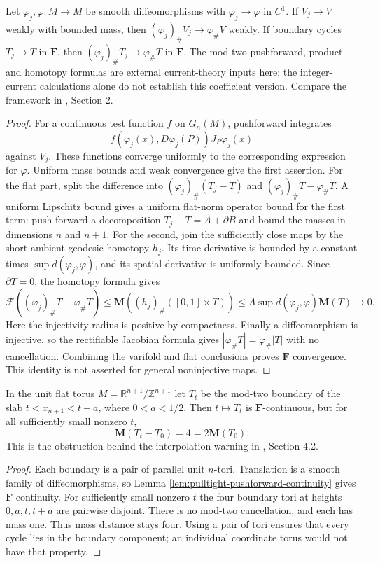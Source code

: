 \begin{lemma}\label{lem:pulltight-pushforward-continuity}
Let $\varphi_j,\varphi:M\to M$ be smooth diffeomorphisms with $\varphi_j\to\varphi$ in $C^1$. If $V_j\to V$ weakly with bounded mass, then $(\varphi_j)_\#V_j\to\varphi_\#V$ weakly. If boundary cycles $T_j\to T$ in $\mathbf F$, then $(\varphi_j)_\#T_j\to\varphi_\#T$ in $\mathbf F$. The mod-two pushforward, product and homotopy formulas are external current-theory inputs here; the integer-current calculations alone do not establish this coefficient version. Compare the framework in \cite{MNIndex}, Section 2.
\end{lemma}
\begin{proof}
For a continuous test function $f$ on $G_n(M)$, pushforward integrates
\[
 f(\varphi_j(x),D\varphi_j(P))J_P\varphi_j(x)
\]
against $V_j$. These functions converge uniformly to the corresponding expression for $\varphi$. Uniform mass bounds and weak convergence give the first assertion.
For the flat part, split the difference into $(\varphi_j)_\#(T_j-T)$ and $(\varphi_j)_\#T-\varphi_\#T$. A uniform Lipschitz bound gives a uniform flat-norm operator bound for the first term: push forward a decomposition $T_j-T=A+\partial B$ and bound the masses in dimensions $n$ and $n+1$. For the second, join the sufficiently close maps by the short ambient geodesic homotopy $h_j$. Its time derivative is bounded by a constant times $\sup d(\varphi_j,\varphi)$, and its spatial derivative is uniformly bounded. Since $\partial T=0$, the homotopy formula gives
\[
 \mathcal F((\varphi_j)_\#T-\varphi_\#T)
 \leq \mathbf M((h_j)_\#([0,1]\times T))
 \leq A\sup d(\varphi_j,\varphi)\mathbf M(T)\longrightarrow0.
\]
Here the injectivity radius is positive by compactness. Finally a diffeomorphism is injective, so the rectifiable Jacobian formula gives $|\varphi_\#T|=\varphi_\#|T|$ with no cancellation. Combining the varifold and flat conclusions proves $\mathbf F$ convergence. This identity is not asserted for general noninjective maps.
\end{proof}

\begin{example}\label{ex:translated-slab-mass-distance}
In the unit flat torus $M=\mathbb R^{n+1}/\mathbb Z^{n+1}$ let $T_t$ be the mod-two boundary of the slab $t<x_{n+1}<t+a$, where $0<a<1/2$. Then $t\mapsto T_t$ is $\mathbf F$-continuous, but for all sufficiently small nonzero $t$,
\[
 \mathbf M(T_t-T_0)=4=2\mathbf M(T_0).
\]
This is the obstruction behind the interpolation warning in \cite{LiAP}, Section 4.2.
\end{example}
\begin{proof}
Each boundary is a pair of parallel unit $n$-tori. Translation is a smooth family of diffeomorphisms, so Lemma \ref{lem:pulltight-pushforward-continuity} gives $\mathbf F$ continuity. For sufficiently small nonzero $t$ the four boundary tori at heights $0,a,t,t+a$ are pairwise disjoint. There is no mod-two cancellation, and each has mass one. Thus mass distance stays four. Using a pair of tori ensures that every cycle lies in the boundary component; an individual coordinate torus would not have that property.
\end{proof}
